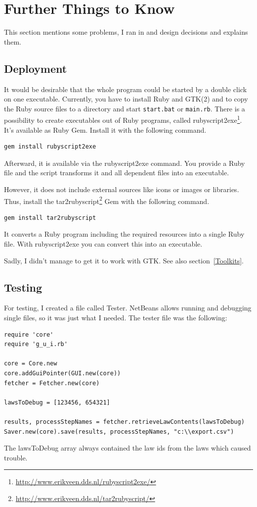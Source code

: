 \documentclass{scrartcl}
\begin{document}
\section{Further Things to Know}
\label{Things to know}
This section mentions some problems, I ran in and design decisions and explains them.


\subsection{Deployment}
\label{Deployment}
It would be desirable that the whole program could be started by a double click on one executable. Currently, you have to install Ruby and GTK(2) and to copy the Ruby source files to a directory and start \texttt{start.bat} or \texttt{main.rb}.
There is a possibility to create executables out of Ruby programs, called rubyscript2exe\footnote{\url{http://www.erikveen.dds.nl/rubyscript2exe/}}. It's available as Ruby Gem. Install it with the following command.
\begin{verbatim}
gem install rubyscript2exe
\end{verbatim}
Afterward, it is available via the rubyscript2exe command. You provide a Ruby file and the script transforms it and all dependent files into an executable.

However, it does not include external sources like icons or images or libraries. Thus, install the tar2rubyscript\footnote{\url{http://www.erikveen.dds.nl/tar2rubyscript/}} Gem with the following command.
\begin{verbatim}
gem install tar2rubyscript
\end{verbatim}

It converts a Ruby program including the required resources into a single Ruby file. With rubyscript2exe you can convert this into an executable.

Sadly, I didn't manage to get it to work with GTK. See also section~\ref{Toolkits}.



\subsection{Testing}
For testing, I created a file called Tester. NetBeans allows running and debugging single files, so it was just what I needed. The tester file was the following:

\begin{verbatim}
require 'core'
require 'g_u_i.rb'

core = Core.new
core.addGuiPointer(GUI.new(core))
fetcher = Fetcher.new(core)

lawsToDebug = [123456, 654321]

results, processStepNames = fetcher.retrieveLawContents(lawsToDebug)
Saver.new(core).save(results, processStepNames, "c:\\export.csv")
\end{verbatim}
The lawsToDebug array always contained the law ids from the laws which caused trouble.
\end{document}
